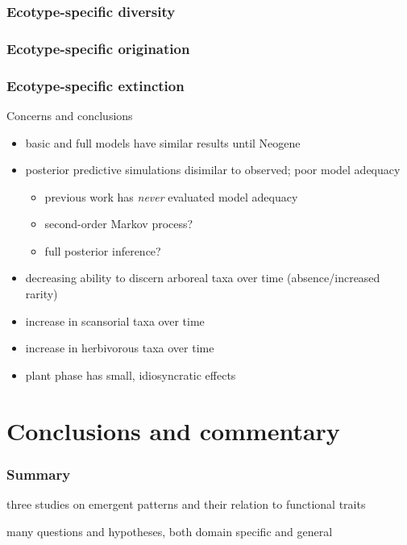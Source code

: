 \documentclass{beamer}
\begin{document}
\begin{frame}
  \frametitle{Ecotype-specific diversity}
\end{frame}

\begin{frame}
  \frametitle{Ecotype-specific origination}
\end{frame}

\begin{frame}
  \frametitle{Ecotype-specific extinction}
\end{frame}

\begin{frame}
  \begin{block}{Concerns and conclusions}
    \begin{itemize}
      \item basic and full models have similar results until Neogene
      \item posterior predictive simulations disimilar to observed; poor model adequacy
        \begin{itemize}
          \item previous work has \emph{never} evaluated model adequacy
          \item second-order Markov process?
          \item full posterior inference?
        \end{itemize}
      \item decreasing ability to discern arboreal taxa over time (absence/increased rarity)
      \item increase in scansorial taxa over time
      \item increase in herbivorous taxa over time
      \item plant phase has small, idiosyncratic effects
    \end{itemize}
  \end{block}
\end{frame}




\section{Conclusions and commentary}
\begin{frame}
  \frametitle{Summary}

  three studies on emergent patterns and their relation to functional traits

  many questions and hypotheses, both domain specific and general
\end{frame}
\end{document}
